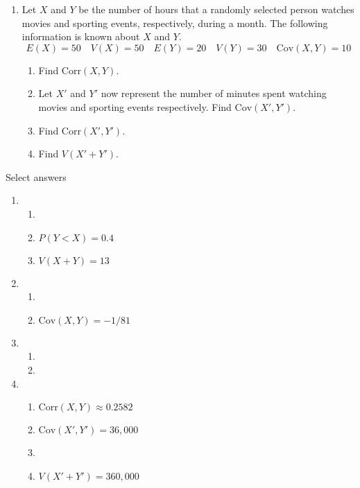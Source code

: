 \documentclass{article}
\newcommand{\cov}[1]{\mathrm{Cov}(#1)}		%
\newcommand{\corr}[1]{\mathrm{Corr}(#1)}		%
\begin{document}
\begin{enumerate}
    \item Let $X$ and $Y$ be the number of hours that a randomly selected person watches movies and sporting events, respectively, during a month. The following information is known about $X$ and $Y$.%
    \[E(X) = 50 \quad V(X) = 50 \quad E(Y) = 20 \quad V(Y) = 30 \quad \cov{X,Y} = 10\]
    \begin{enumerate}%
        \item Find $\corr{X,Y}$.
        \item Let $X'$ and $Y'$ now represent the number of minutes spent watching movies and sporting events respectively. Find $\cov{X',Y'}$.
        \item Find $\corr{X',Y'}$.
        \item Find $V(X' + Y')$.
    \end{enumerate}
    
\end{enumerate}

\newpage
    
Select answers\bigskip
\begin{enumerate}
    \item 
    \begin{enumerate}
        \item 
        \item $P(Y < X) = 0.4$
        \item $V(X + Y) = 13$
    \end{enumerate}
    
    \item 
    \begin{enumerate}
        \item 
        \item $\cov{X, Y} = -1/81$
    \end{enumerate}
    
    \item 
    \begin{enumerate}
        \item 
        \item 
    \end{enumerate}
    
    \item 
    \begin{enumerate}
        \item $\corr{X, Y} \approx 0.2582$ 
        \item $\cov{X', Y'} = 36,000$ 
        \item 
        \item $V(X' + Y') = 360,000$
    \end{enumerate}
        
\end{enumerate}
\end{document}
